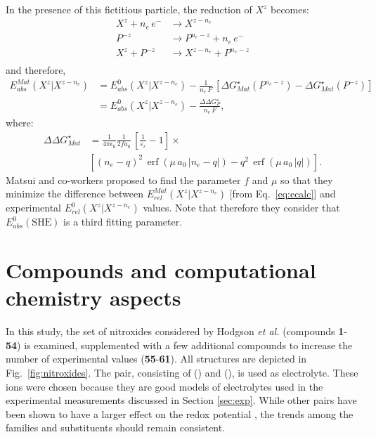 \documentclass[review,preprint]{elsarticle}
\DeclareMathOperator{\erf}{erf}
\begin{document}
In the presence of this fictitious particle, the reduction of $X^z$ becomes:\begin{equation*}
	\begin{array}{rl}
		X^z + n_e\,e^- &\rightarrow X^{z-n_e} \\
		P^{-z} \phantom{ + n_e\,e^-} &\rightarrow P^{n_e-z} + n_e\,e^- \\
		\hline
		X^z + P^{-z}&\rightarrow X^{z-n_e} +P^{n_e-z}\\
	\end{array}  \label{eq:corr}
\end{equation*}
and therefore,\begin{align}
	E^{Mat}_{abs}(X^z|X^{z-n_e}) &= 	E_{abs}^0(X^{z}|X^{z-n_e}) -\frac{1}{n_e\,F}\,[\Delta G^\star_{Mat}(P^{n_e-z}) - \Delta G^\star_{Mat}(P^{-z})] \nonumber\\
	&= 	E_{abs}^0(X^{z}|X^{z-n_e}) -\frac{\Delta\Delta G^\star_P}{n_e\,F}, \label{eq:matsui} 
\end{align}
where:\begin{align*}
	\Delta\Delta G^\star_{Mat}&=\frac{1}{4\pi\epsilon_0}\frac{1}{2fa_0}\,\left[\frac{1}{\varepsilon_r}-1\right]\times\nonumber\\
	&\left[ (n_e-q)^2\,\erf(\mu\,a_0\,|n_e-q|)-q^2\,\erf(\mu\,a_0\,|q|)\right].
\end{align*}
Matsui and co-workers proposed to  find the parameter $f$ and $\mu$ so that they minimize the difference between $E^{Mat}_{rel}(X^z|X^{z-n_e})$  [from Eq.~\eqref{eq:ecalc}] and experimental $E^0_{rel}(X^z|X^{z-n_e})$ values.  Note that therefore they consider that $ E^{0}_{abs}(\text{SHE})$ is a third fitting parameter.

\section{Compounds and computational chemistry aspects} \label{sec:methodo}

In this study, the set of nitroxides considered by Hodgson \textit{et al.} (compounds \textbf{1}-\textbf{54}) is examined, supplemented with a few additional compounds to increase the number of experimental values (\textbf{55}-\textbf{61}). All structures are depicted in Fig.~\ref{fig:nitroxides}. The  pair, consisting of  () and  (), is used as electrolyte. These ions were chosen because they are good models of electrolytes used in the experimental measurements discussed in Section \ref{sec:exp}. While other pairs have been shown to have a larger effect on the redox potential \cite{wylieImprovedPerformanceAllOrganic2019a}, the trends among the families and substituents should remain consistent.
\end{document}
